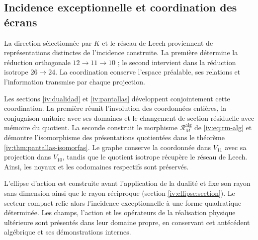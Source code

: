 \subsection{Incidence exceptionnelle et coordination des écrans}
\label{exc:pantallas-dualidad}

La direction sélectionnée par \(K\) et le réseau de Leech proviennent
de représentations distinctes de l’incidence construite. La première
détermine la réduction orthogonale \(12\to11\to10\) ; le second
intervient dans la réduction isotrope \(26\to24\). La coordination
conserve l’espace préalable, ses relations et l’information transmise
par chaque projection.

Les sections \ref{iv:dualidad} et \ref{iv:pantallas} développent
conjointement cette coordination. La première réunit l’involution des
coordonnées entières, la conjugaison unitaire avec ses domaines et le
changement de section résiduelle avec mémoire du quotient. La seconde
construit le morphisme \(\mathcal R_M^{\mathrm{alg}}\) de
\eqref{iv:eq:rm-alg} et démontre l’isomorphisme des présentations
quotientées dans le théorème \ref{iv:thm:pantallas-isomorfas}.
Le graphe conserve la coordonnée dans \(V_{11}\) avec sa projection
dans \(V_{10}\), tandis que le quotient isotrope récupère le réseau
de Leech. Ainsi, les noyaux et les codomaines respectifs sont préservés.


L’ellipse d’action est construite avant l’application de la dualité et fixe
son rayon sans dimension ainsi que le rayon réciproque
(section \ref{iv:ellipse:section}). Le secteur compact relie alors
l’incidence exceptionnelle à une forme quadratique déterminée. Les
champs, l’action et les opérateurs de la réalisation physique ultérieure
sont présentés dans leur domaine propre, en conservant cet antécédent
algébrique et ses démonstrations internes.
